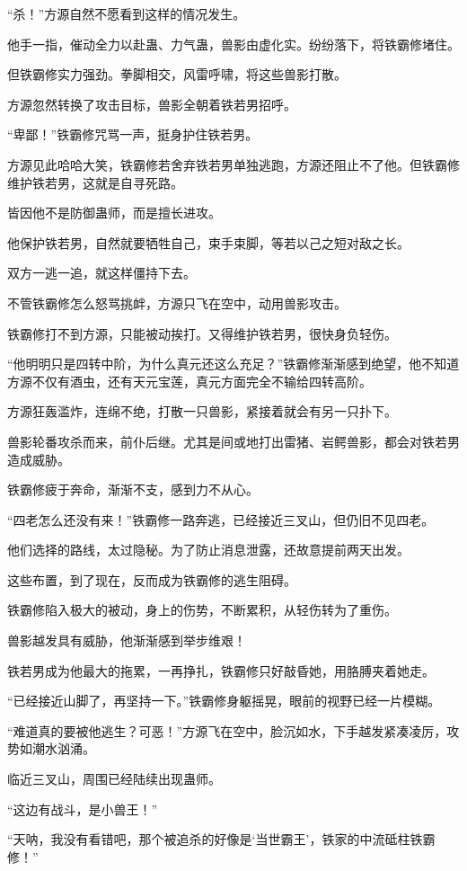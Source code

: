 \begin{this_body}
“杀！”方源自然不愿看到这样的情况发生。

他手一指，催动全力以赴蛊、力气蛊，兽影由虚化实。纷纷落下，将铁霸修堵住。

但铁霸修实力强劲。拳脚相交，风雷呼啸，将这些兽影打散。

方源忽然转换了攻击目标，兽影全朝着铁若男招呼。

“卑鄙！”铁霸修咒骂一声，挺身护住铁若男。

方源见此哈哈大笑，铁霸修若舍弃铁若男单独逃跑，方源还阻止不了他。但铁霸修维护铁若男，这就是自寻死路。

皆因他不是防御蛊师，而是擅长进攻。

他保护铁若男，自然就要牺牲自己，束手束脚，等若以己之短对敌之长。

双方一逃一追，就这样僵持下去。

不管铁霸修怎么怒骂挑衅，方源只飞在空中，动用兽影攻击。

铁霸修打不到方源，只能被动挨打。又得维护铁若男，很快身负轻伤。

“他明明只是四转中阶，为什么真元还这么充足？”铁霸修渐渐感到绝望，他不知道方源不仅有酒虫，还有天元宝莲，真元方面完全不输给四转高阶。

方源狂轰滥炸，连绵不绝，打散一只兽影，紧接着就会有另一只扑下。

兽影轮番攻杀而来，前仆后继。尤其是间或地打出雷猪、岩鳄兽影，都会对铁若男造成威胁。

铁霸修疲于奔命，渐渐不支，感到力不从心。

“四老怎么还没有来！”铁霸修一路奔逃，已经接近三叉山，但仍旧不见四老。

他们选择的路线，太过隐秘。为了防止消息泄露，还故意提前两天出发。

这些布置，到了现在，反而成为铁霸修的逃生阻碍。

铁霸修陷入极大的被动，身上的伤势，不断累积，从轻伤转为了重伤。

兽影越发具有威胁，他渐渐感到举步维艰！

铁若男成为他最大的拖累，一再挣扎，铁霸修只好敲昏她，用胳膊夹着她走。

“已经接近山脚了，再坚持一下。”铁霸修身躯摇晃，眼前的视野已经一片模糊。

“难道真的要被他逃生？可恶！”方源飞在空中，脸沉如水，下手越发紧凑凌厉，攻势如潮水汹涌。

临近三叉山，周围已经陆续出现蛊师。

“这边有战斗，是小兽王！”

“天呐，我没有看错吧，那个被追杀的好像是‘当世霸王’，铁家的中流砥柱铁霸修！”


\end{this_body}
